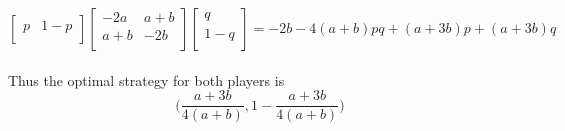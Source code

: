 \documentclass[12pt,oneside]{amsart}
\numberwithin{equation}{section}
\numberwithin{figure}{section}
\theoremstyle{plain}
\theoremstyle{definition}
\begin{document}
\begin{enumerate}
\[\begin{bmatrix}
      p & 1-p \\
    \end{bmatrix}\begin{bmatrix}
      -2a & a+b \\
      a+b & -2b \\
    \end{bmatrix}\begin{bmatrix}
      q   \\
      1-q \\
    \end{bmatrix} = -2b -4(a+b)pq + (a + 3b)p + (a + 3b)q\] \\
    Thus the optimal strategy for both players is \\
    \[\bigg(\frac{a+3b}{4(a+b)},1 - \frac{a+3b}{4(a+b)}\bigg)\] \\
\end{enumerate}
\end{document}
